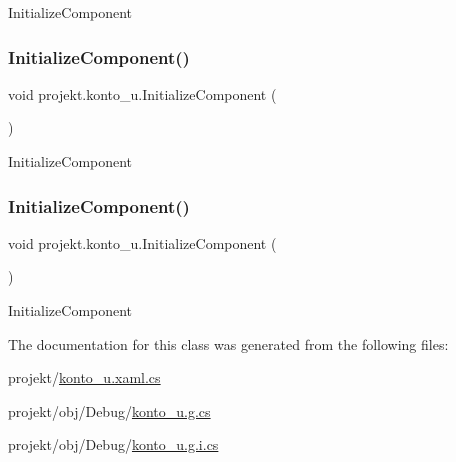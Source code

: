 Initialize\+Component 

\mbox{\label{classprojekt_1_1konto__u_aba94445ce67074714f9c38935885c165}} 
\subsubsection{\texorpdfstring{Initialize\+Component()}{InitializeComponent()}\hspace{0.1cm}{\footnotesize\ttfamily [8/9]}}
{\footnotesize\ttfamily void projekt.\+konto\+\_\+u.\+Initialize\+Component (\begin{DoxyParamCaption}{ }\end{DoxyParamCaption})\hspace{0.3cm}{\ttfamily [inline]}}



Initialize\+Component 

\mbox{\label{classprojekt_1_1konto__u_aba94445ce67074714f9c38935885c165}} 
\subsubsection{\texorpdfstring{Initialize\+Component()}{InitializeComponent()}\hspace{0.1cm}{\footnotesize\ttfamily [9/9]}}
{\footnotesize\ttfamily void projekt.\+konto\+\_\+u.\+Initialize\+Component (\begin{DoxyParamCaption}{ }\end{DoxyParamCaption})\hspace{0.3cm}{\ttfamily [inline]}}



Initialize\+Component 



The documentation for this class was generated from the following files\+:\begin{DoxyCompactItemize}
\item 
projekt/\mbox{\hyperlink{konto__u_8xaml_8cs}{konto\+\_\+u.\+xaml.\+cs}}\item 
projekt/obj/\+Debug/\mbox{\hyperlink{_debug_2konto__u_8g_8cs}{konto\+\_\+u.\+g.\+cs}}\item 
projekt/obj/\+Debug/\mbox{\hyperlink{_debug_2konto__u_8g_8i_8cs}{konto\+\_\+u.\+g.\+i.\+cs}}\end{DoxyCompactItemize}

